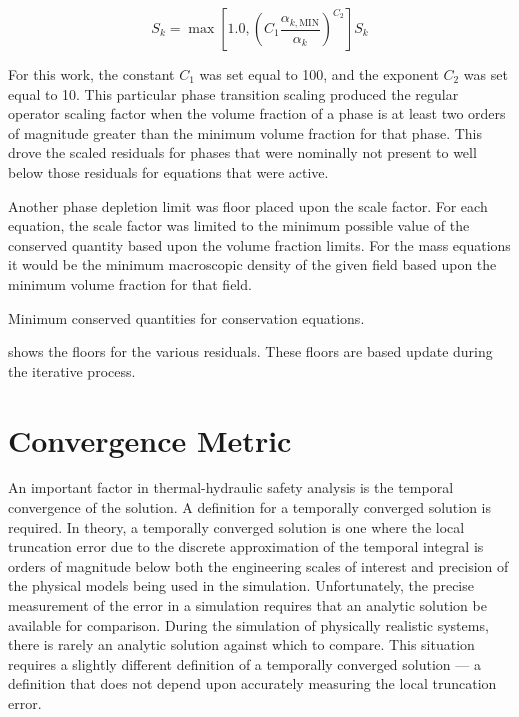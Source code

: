 \begin{equation}
\label{eqn:scaling_factor_small}
S_k = \max[1.0, \left(C_1 \frac{\alpha_{k,\text{MIN}}}{\alpha_k}\right)^{C_2} ] S_k
\end{equation}

For this work, the constant $C_1$ was set equal to 100, and the exponent $C_2$ was set equal to 10.
This particular phase transition scaling produced the regular operator scaling factor when the volume fraction of a phase is at least two orders of magnitude greater than the minimum volume fraction for that phase.
This drove the scaled residuals for phases that were nominally not present to well below those residuals for equations that were active.

Another phase depletion limit was floor placed upon the scale factor.
For each equation, the scale factor was limited to the minimum possible value of the conserved quantity based upon the volume fraction limits.
For the mass equations it would be the minimum macroscopic density of the given field based upon the minimum volume fraction for that field.


\begin{table}[ht]
\centering

\caption{Minimum conserved quantities for conservation equations.}
\label{tab:minimumConservedValues}
\end{table}

 shows the floors for the various residuals.
These floors are based update during the iterative process.

\section{Convergence Metric}
\label{sect:temporal_convergence}

An important factor in thermal-hydraulic safety analysis is the temporal convergence of the solution.
A definition for a temporally converged solution is required.
In theory, a temporally converged solution is one where the local truncation error due to the discrete approximation of the temporal integral is orders of magnitude below both the engineering scales of interest and precision of the physical models being used in the simulation.
Unfortunately, the precise measurement of the error in a simulation requires that an analytic solution be available for comparison.
During the simulation of physically realistic systems, there is rarely an analytic solution against which to compare.
This situation requires a slightly different definition of a temporally converged solution --- a definition that does not depend upon accurately measuring the local truncation error.

